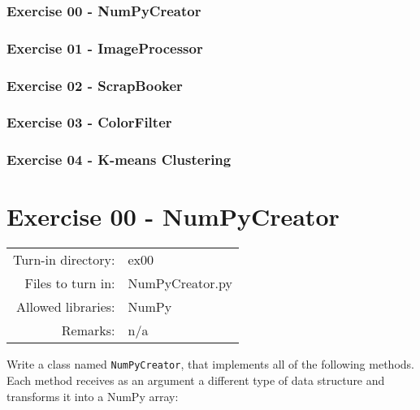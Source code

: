 \documentclass[]{article}
\begin{document}
\hypertarget{exercise-00---numpycreator}{%
\subsubsection{Exercise 00 -
NumPyCreator}\label{exercise-00---numpycreator}}

\hypertarget{exercise-01---imageprocessor}{%
\subsubsection{Exercise 01 -
ImageProcessor}\label{exercise-01---imageprocessor}}

\hypertarget{exercise-02---scrapbooker}{%
\subsubsection{Exercise 02 -
ScrapBooker}\label{exercise-02---scrapbooker}}

\hypertarget{exercise-03---colorfilter}{%
\subsubsection{Exercise 03 -
ColorFilter}\label{exercise-03---colorfilter}}

\hypertarget{exercise-04---k-means-clustering}{%
\subsubsection{Exercise 04 - K-means
Clustering}\label{exercise-04---k-means-clustering}}

\clearpage

\hypertarget{exercise-00---numpycreator-1}{%
\section{Exercise 00 -
NumPyCreator}\label{exercise-00---numpycreator-1}}

\begin{longtable}[]{@{}rl@{}}
\toprule
\endhead
Turn-in directory: & ex00\tabularnewline
Files to turn in: & NumPyCreator.py\tabularnewline
Allowed libraries: & NumPy\tabularnewline
Remarks: & n/a\tabularnewline
\bottomrule
\end{longtable}

Write a class named \texttt{NumPyCreator}, that implements all of the
following methods.\\
Each method receives as an argument a different type of data structure
and transforms it into a NumPy array:
\end{document}
